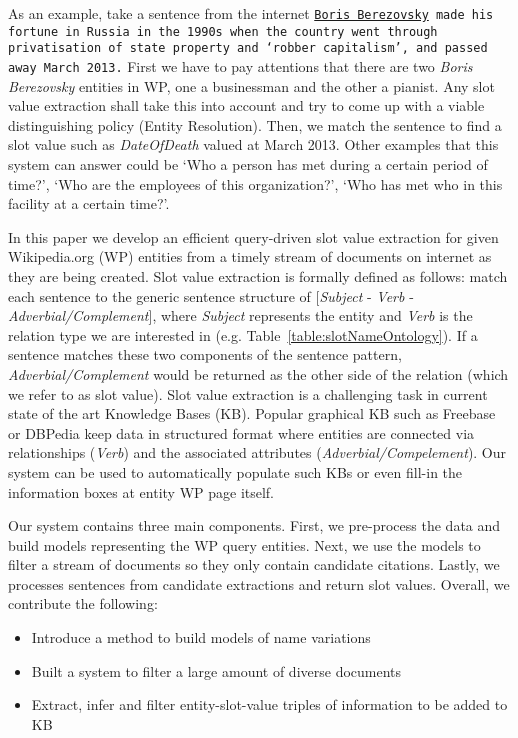 As an example, take a sentence from the internet \texttt{\underline{Boris Berezovsky} made his fortune in Russia in the 1990s when the country went through privatisation of state property and `robber capitalism', and passed away March 2013.}
First we have to pay attentions that there are two \textit{Boris Berezovsky} entities in WP, one a businessman and the other a pianist. Any slot value extraction shall take this into account and try to come up with a viable distinguishing policy (Entity Resolution). Then, we match the sentence to find a slot value such as \textit{DateOfDeath} valued at March 2013. Other examples that this system can answer could be `Who a person has met during a certain period of time?', `Who are the employees of this organization?', `Who has met who in this facility at a certain time?'.


In this paper we develop an efficient query-driven slot value extraction for given Wikipedia.org (WP) entities from a timely stream of documents on internet as they are being created. Slot value extraction is formally defined as follows: match each sentence to the generic sentence structure of [\textit{Subject} - \textit{Verb} - \textit{Adverbial/Complement}]\cite{sentencePatterns08}, where  \textit{Subject} represents the entity and \textit{Verb} is the relation type we are interested in (e.g. Table~\ref{table:slotNameOntology}). If a sentence matches these two components of the sentence pattern, \textit{Adverbial/Complement} would be returned as the other side of the relation (which we refer to as slot value). Slot value extraction is a challenging task in current state of the art Knowledge Bases (KB). Popular graphical KB such as Freebase or DBPedia keep data in structured format where entities are connected via relationships (\textit{Verb}) and the associated attributes (\textit{Adverbial/Compelement}). Our system can be used to automatically populate such KBs or even fill-in the information boxes at entity WP page itself.


Our system contains three main components. First, we pre-process the data and build models representing the WP query entities. Next, we use the models to filter a stream of documents so they only contain candidate citations. Lastly, we processes sentences from candidate extractions and return slot values. 
Overall, we contribute the following:
\begin{itemize}[noitemsep,nolistsep]
\item Introduce a method to build models of name variations
\item Built a system to filter a large amount of diverse documents
\item Extract, infer and filter entity-slot-value triples of information to be added to KB 
\end{itemize}

